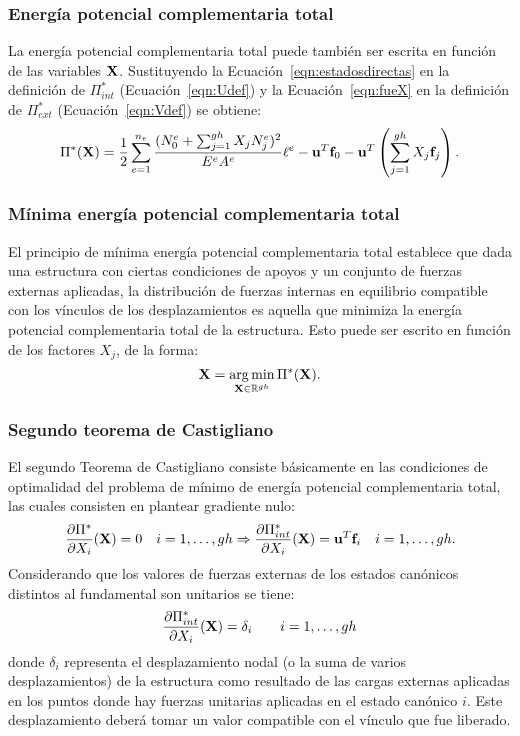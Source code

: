 \subsubsection{Energía potencial complementaria total}

La energía potencial complementaria total puede también ser escrita en función de las variables ${\bf X}$. %
%
Sustituyendo la Ecuación~\eqref{eqn:estadosdirectas} en la definición de $\Pi_{int}^*$ (Ecuación~\eqref{eqn:Udef})  y la Ecuación~\eqref{eqn:fueX} en la definición de $\Pi_{ext}^*$ (Ecuación~\eqref{eqn:Vdef}) se obtiene:
%
\begin{equation}
\Pi^* ({\bf X}) = \frac{1}{2}  \sum_{e=1}^{n_e} \frac{(N_0^e + \sum_{j=1}^{gh} X_j N_j^e)^2}{E^e A^e} \ell^e - {\bf u}^T {\bf f}_0 - {\bf u}^T \left( \sum_{j=1}^{gh} X_j {\bf f}_j \right).
\end{equation}


\subsubsection{Mínima energía potencial complementaria total}

El principio de mínima energía potencial complementaria total establece que dada una estructura con ciertas condiciones de apoyos y un conjunto de fuerzas externas aplicadas, la distribución de fuerzas internas en equilibrio compatible con los vínculos de los desplazamientos es aquella que minimiza la energía potencial complementaria total de la estructura. Esto puede ser escrito en función de los factores $X_j$, de la forma:
%
\begin{equation}
\textbf{X} = \operatorname*{arg\,min}_{\textbf{X} \in {\mathbb R}^{gh} } \Pi^*(\textbf{X}).
\end{equation}

\subsubsection{Segundo teorema de Castigliano}

El segundo Teorema de Castigliano consiste básicamente en las condiciones de optimalidad del problema de mínimo de energía potencial complementaria total, %
%
las cuales consisten en plantear gradiente nulo:
%
\begin{equation}
\frac{\partial \Pi^*}{ \partial X_i}({\bf X}) = 0  \quad i=1,\dots,gh \Rightarrow 
\frac{\partial \Pi_{int}^*}{ \partial X_i}({\bf X}) = {\bf u}^T {\bf f}_i \quad i=1,\dots,gh.
\end{equation}
%
Considerando que los valores de fuerzas externas de los estados canónicos distintos al fundamental son unitarios se tiene:
%
\begin{equation}
\frac{\partial \Pi_{int}^*}{ \partial X_i}({\bf X}) =  \delta_i \qquad i=1,\dots,gh
\end{equation}
%
donde $\delta_i$ representa el desplazamiento nodal (o la suma de varios desplazamientos) de la estructura como resultado de las cargas externas aplicadas en los puntos donde hay fuerzas unitarias aplicadas en el estado canónico $i$. %
%
Este desplazamiento deberá tomar un valor compatible con el vínculo que fue liberado. %

